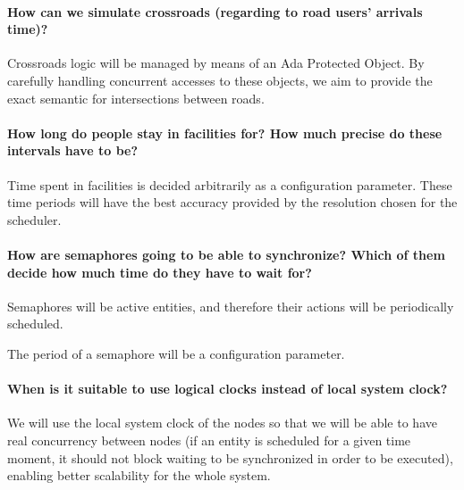 \paragraph{How can we simulate crossroads (regarding to road users' arrivals
  time)?}
Crossroads logic will be managed by means of an Ada Protected Object. By
carefully handling concurrent accesses to these objects, we aim to provide the
exact semantic for intersections between roads.

\paragraph{How long do people stay in facilities for? How much precise do these
  intervals have to be?}
Time spent in facilities is decided arbitrarily as a configuration parameter.
These time periods will have the best accuracy provided by the resolution
chosen for the scheduler.

\paragraph{How are semaphores going to be able to synchronize? Which of them
  decide how much time do they have to wait for?}
Semaphores will be active entities, and therefore their actions will be
periodically scheduled.

The period of a semaphore will be a configuration parameter.

\paragraph{When is it suitable to use logical clocks instead of local system
  clock?}
We will use the local system clock of the nodes so that we will be able to
have real concurrency between nodes (if an entity is scheduled for a given
time moment, it should not block waiting to be synchronized in order to be
executed), enabling better scalability for the whole system.
